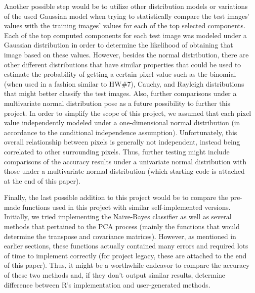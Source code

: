 \documentclass[twocolumn]{article}
\begin{document}
Another possible step would be to utilize other distribution models or variations of the used Gaussian model when trying to statistically compare the test images' values with the training images' values for each of the top selected components. Each of the top computed components for each test image was modeled under a Gaussian distribution in order to determine the likelihood of obtaining that image based on these values. However, besides the normal distribution, there are other different distributions that have similar properties that could be used to estimate the probability of getting a certain pixel value such as the binomial (when used in a fashion similar to HW\#7), Cauchy, and Rayleigh distributions that might better classify the test images. Also, further comparisons under a multivariate normal distribution pose as a future possibility to further this project. In order to simplify the scope of this project, we assumed that each pixel value independently modeled under a one-dimensional normal distribution (in accordance to the conditional independence assumption). Unfortunately, this overall relationship between pixels is generally not independent, instead being correlated to other surrounding pixels. Thus, further testing might include comparisons of the accuracy results under a univariate normal distribution with those under a multivariate normal distribution (which starting code is attached at the end of this paper). 

Finally, the last possible addition to this project would be to compare the pre-made functions used in this project with similar self-implemented versions. Initially, we tried implementing the Naive-Bayes classifier as well as several methods that pertained to the PCA process (mainly the functions that would determine the transpose and covariance matrices). However, as mentioned in earlier sections, these functions actually contained many errors and required lots of time to implement correctly (for project legacy, these are attached to the end of this paper). Thus, it might be a worthwhile endeavor to compare the accuracy of these two methods and, if they don't output similar results, determine difference between R's implementation and user-generated methods.





\onecolumn
\appendix

\end{document}
